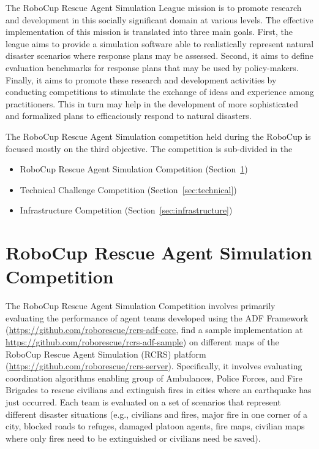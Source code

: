 \documentclass{article}
\begin{document}
The RoboCup Rescue Agent Simulation League mission is to promote research and 
development in this socially significant domain at various levels. The effective
implementation of this mission is translated into three main goals. First, the
league aims to provide a simulation software able to realistically represent
natural disaster scenarios where response plans may be assessed. Second, it aims
to define evaluation benchmarks for response plans that may be used by
policy-makers. Finally, it aims to promote these research and development
activities by conducting competitions to stimulate the exchange of ideas and
experience among practitioners. This in turn may help in the development of more
sophisticated and formalized plans to efficaciously respond to natural disasters.

The RoboCup Rescue Agent Simulation competition held during the RoboCup is
focused mostly on the third objective. The competition is sub-divided in the
\begin{itemize}
\item RoboCup Rescue Agent Simulation Competition (Section~\ref{sec:agent})
\item Technical Challenge Competition (Section~\ref{sec:technical})
\item Infrastructure Competition (Section~\ref{sec:infrastructure})
\end{itemize}
\section{RoboCup Rescue Agent Simulation Competition}
\label{sec:agent}
The RoboCup Rescue Agent Simulation Competition involves primarily
evaluating the performance of agent teams developed using the ADF Framework 
(\url{https://github.com/roborescue/rcrs-adf-core}, find a sample implementation
at \url{https://github.com/roborescue/rcrs-adf-sample}) on different maps of the
RoboCup Rescue Agent Simulation (RCRS) platform
 (\url{https://github.com/roborescue/rcrs-server}). Specifically, it involves
evaluating coordination algorithms enabling group of Ambulances, Police Forces,
and Fire Brigades to rescue civilians and extinguish fires in cities where an
earthquake has just occurred. Each team is evaluated on a set of scenarios that
represent different disaster situations (e.g., civilians and fires, major fire
in one corner of a city, blocked roads to refuges, damaged platoon agents, fire
maps, civilian maps where only fires need to be extinguished or civilians need
be saved).
\end{document}
